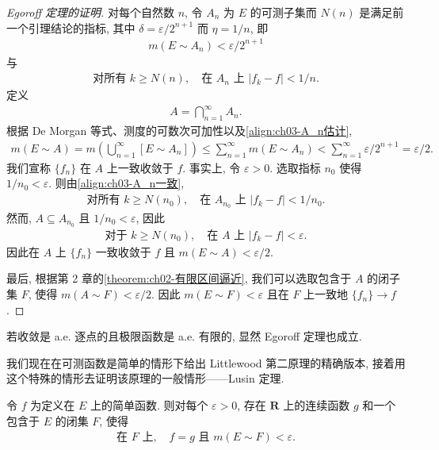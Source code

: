 \documentclass[../../main.tex]{subfiles}
\begin{document}
\begin{proof}[Egoroff 定理的证明]
对每个自然数 $n$, 令 $A_{n}$ 为 $E$ 的可测子集而 $N(n)$ 是满足前一个引理结论的指标, 其中 $\delta=\varepsilon/2^{n+1}$ 而 $\eta=1/n$, 即
\begin{align}
m(E\sim A_{n})<\varepsilon/2^{n+1}\label{align:ch03-A_n估计}
\end{align}
与
\begin{align}
\text{对所有 }k\geqslant N(n),\quad\text{在 }A_{n}\text{ 上 }|f_{k}-f|<1/n.\label{align:ch03-A_n一致}
\end{align}
定义
\begin{align*}
A=\bigcap_{n=1}^{\infty}A_{n}.
\end{align*}
根据 De Morgan 等式、测度的可数次可加性以及\eqref{align:ch03-A_n估计},
\begin{align*}
m(E\sim A)=m\left(\bigcup_{n=1}^{\infty}[E\sim A_{n}]\right)\leqslant\sum_{n=1}^{\infty}m(E\sim A_{n})<\sum_{n=1}^{\infty}\varepsilon/2^{n+1}=\varepsilon/2.
\end{align*}
我们宣称 $\{f_{n}\}$ 在 $A$ 上一致收敛于 $f$. 事实上, 令 $\varepsilon>0$. 选取指标 $n_{0}$ 使得 $1/n_{0}<\varepsilon$. 则由\eqref{align:ch03-A_n一致},
\begin{align*}
\text{对所有 }k\geqslant N(n_{0}),\quad\text{在 }A_{n_{0}}\text{ 上 }|f_{k}-f|<1/n_{0}.
\end{align*}
然而, $A\subseteq A_{n_{0}}$ 且 $1/n_{0}<\varepsilon$, 因此
\begin{align*}
\text{对于 }k\geqslant N(n_{0}),\quad\text{在 }A\text{ 上 }|f_{k}-f|<\varepsilon.
\end{align*}
因此在 $A$ 上 $\{f_{n}\}$ 一致收敛于 $f$ 且 $m(E\sim A)<\varepsilon/2$.

最后, 根据第 2 章的\cref{theorem:ch02-有限区间逼近}, 我们可以选取包含于 $A$ 的闭子集 $F$, 使得 $m(A\sim F)<\varepsilon/2$. 因此 $m(E\sim F)<\varepsilon$ 且在 $F$ 上一致地 $\{f_{n}\}\to f$.
\end{proof}

若收敛是 a.e. 逐点的且极限函数是 a.e. 有限的, 显然 Egoroff 定理也成立.

我们现在在可测函数是简单的情形下给出 Littlewood 第二原理的精确版本, 接着用这个特殊的情形去证明该原理的一般情形——Lusin 定理.

\begin{proposition}\label{proposition:ch03-简单函数连续逼近}
令 $f$ 为定义在 $E$ 上的简单函数. 则对每个 $\varepsilon>0$, 存在 $\mathbf{R}$ 上的连续函数 $g$ 和一个包含于 $E$ 的闭集 $F$, 使得
\begin{align*}
\text{在 }F\text{ 上},\quad f=g\text{ 且 }m(E\sim F)<\varepsilon.
\end{align*}
\end{proposition}
\end{document}
